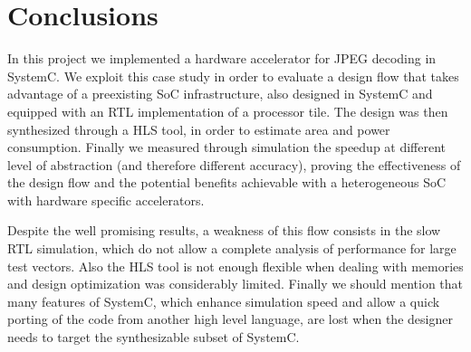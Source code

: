 \documentclass{acm_proc_article-sp}
\begin{document}
\section{Conclusions}
\label{sec:end}

In this project we implemented a hardware accelerator for JPEG decoding in SystemC.
We exploit this case study in order to evaluate a design flow that takes advantage
of a preexisting SoC infrastructure, also designed in SystemC and equipped with an RTL
implementation of a processor tile. The design was then synthesized through a HLS
tool, in order to estimate area and power consumption. Finally we measured through simulation
the speedup at different level of abstraction (and therefore different accuracy),
proving the effectiveness of the design flow and the potential benefits achievable
with a heterogeneous SoC with hardware specific accelerators.

Despite the well promising results, a weakness of this flow consists in the slow RTL
simulation, which do not allow a complete analysis of performance for large test vectors.
Also the HLS tool is not enough flexible when dealing with memories and design optimization
was considerably limited. Finally we should mention that many features of SystemC,
which enhance simulation speed and allow a quick porting of the code from another
high level language, are lost when the designer needs to target the synthesizable subset of
SystemC.


%
%
\end{document}
